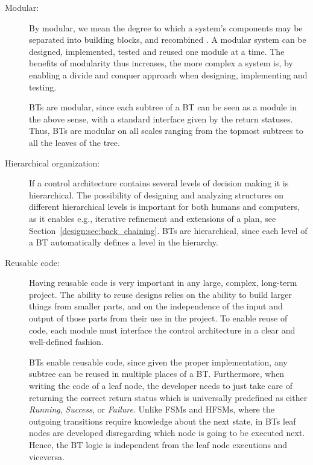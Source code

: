 \begin{description}
\item[Modular:] 
By modular, we mean the degree to which a system's components may be separated into building blocks, and recombined \cite{gershenson2003product}. 
A modular system can be designed, implemented, tested and reused one module at a time.
The benefits of modularity thus increases, the more complex a system is, by 
enabling a divide and conquer approach when designing, implementing and testing.

BTs are modular, since each subtree of a BT can be seen as a module in the above sense, with a standard interface given by the return statuses. 
Thus,  BTs are modular on all scales ranging from the topmost subtrees to all the leaves of the tree.



\item[Hierarchical organization:] 
If a control architecture contains several levels of decision making it is hierarchical.
The possibility of designing and analyzing structures on different hierarchical levels
 is important for both humans and computers, as it enables e.g., iterative refinement and extensions of a plan, see Section~\ref{design:sec:back_chaining}. BTs are hierarchical, since each level of a BT automatically defines a  level in the hierarchy.

 \item[Reusable code:] 
Having reusable code is very important in any large, complex, long-term project. The ability to reuse designs relies  on the ability to build larger things from smaller parts, and on the independence of the input and output of those parts from their use in the project. 
 To enable reuse of code, each module must interface the  control architecture  in a clear and well-defined fashion.

BTs enable  reusable code, since given the proper implementation, any subtree can be reused in multiple places of a BT.
Furthermore, when writing the code of a leaf node, the developer needs to just take care of returning the correct return status which is universally predefined as either \emph{Running}, \emph{Success}, or \emph{Failure}. Unlike FSMs and HFSMs, where the outgoing transitions require  knowledge about the next state, in BTs leaf nodes are developed disregarding which node is going to be executed next. Hence, the BT logic is independent from the leaf node executions and viceversa. 



\end{description}
